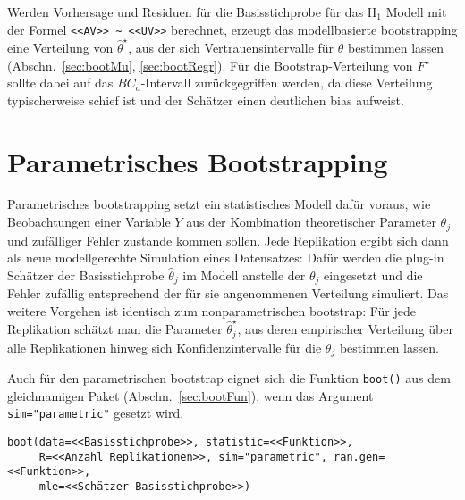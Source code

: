 Werden Vorhersage und Residuen für die Basisstichprobe für das $\text{H}_{1}$ Modell mit der Formel \lstinline!<<AV>> ~ <<UV>>! berechnet, erzeugt das modellbasierte bootstrapping eine Verteilung von $\hat{\theta}^{\star}$, aus der sich Vertrauensintervalle für $\theta$ bestimmen lassen (Abschn.\ \ref{sec:bootMu}, \ref{sec:bootRegr}). Für die Bootstrap-Verteilung von $F^{\star}$ sollte dabei auf das $BC_{a}$-Intervall zurückgegriffen werden, da diese Verteilung typischerweise schief ist und der Schätzer einen deutlichen bias aufweist.

\section{Parametrisches Bootstrapping}
\label{sec:bootParam}

Parametrisches bootstrapping setzt ein statistisches Modell dafür voraus, wie Beobachtungen einer Variable $Y$ aus der Kombination theoretischer Parameter $\theta_{j}$ und zufälliger Fehler zustande kommen sollen. Jede Replikation ergibt sich dann als neue modellgerechte Simulation eines Datensatzes: Dafür werden die plug-in Schätzer der Basisstichprobe $\hat{\theta}_{j}$ im Modell anstelle der $\theta_{j}$ eingesetzt und die Fehler zufällig entsprechend der für sie angenommenen Verteilung simuliert. Das weitere Vorgehen ist identisch zum nonparametrischen bootstrap: Für jede Replikation schätzt man die Parameter $\hat{\theta}_{j}^{\star}$, aus deren empirischer Verteilung über alle Replikationen hinweg sich Konfidenzintervalle für die $\theta_{j}$ bestimmen lassen.

Auch für den parametrischen bootstrap eignet sich die Funktion \lstinline!boot()! aus dem gleichnamigen Paket (Abschn.\ \ref{sec:bootFun}), wenn das Argument \lstinline!sim="parametric"! gesetzt wird.
\begin{lstlisting}
boot(data=<<Basisstichprobe>>, statistic=<<Funktion>>,
     R=<<Anzahl Replikationen>>, sim="parametric", ran.gen=<<Funktion>>,
     mle=<<Schätzer Basisstichprobe>>)
\end{lstlisting}

